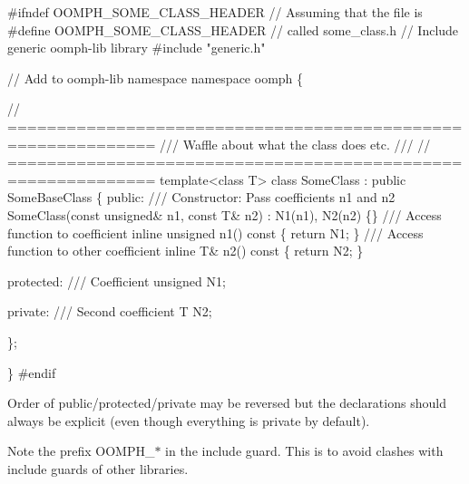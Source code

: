 \begin{DoxyCode}
\textcolor{preprocessor}{#ifndef OOMPH\_SOME\_CLASS\_HEADER     // Assuming that the file is }
\textcolor{preprocessor}{}\textcolor{preprocessor}{#define OOMPH\_SOME\_CLASS\_HEADER     // called some\_class.h}
\textcolor{preprocessor}{}
\textcolor{comment}{// Include generic oomph-lib library}
\textcolor{preprocessor}{#include "generic.h"}

\textcolor{comment}{// Add to oomph-lib namespace}
\textcolor{keyword}{namespace }oomph
\{

\textcolor{comment}{// =============================================================}\textcolor{comment}{}
\textcolor{comment}{/// Waffle about what the class does etc.}
\textcolor{comment}{/// }
\textcolor{comment}{}\textcolor{comment}{// =============================================================}
\textcolor{keyword}{template}<\textcolor{keyword}{class} T>
\textcolor{keyword}{class }SomeClass : \textcolor{keyword}{public} SomeBaseClass
 \{
   \textcolor{keyword}{public}: 
\textcolor{comment}{}
\textcolor{comment}{    /// Constructor: Pass coefficients n1 and n2}
\textcolor{comment}{}    SomeClass(\textcolor{keyword}{const} \textcolor{keywordtype}{unsigned}& n1, \textcolor{keyword}{const} T& n2) : N1(n1), N2(n2)
     \{\}
\textcolor{comment}{}
\textcolor{comment}{    /// Access function to coefficient }
\textcolor{comment}{}    \textcolor{keyword}{inline} \textcolor{keywordtype}{unsigned} n1()\textcolor{keyword}{ const}
\textcolor{keyword}{     }\{
      \textcolor{keywordflow}{return} N1;
     \}
\textcolor{comment}{}
\textcolor{comment}{    /// Access function to other coefficient}
\textcolor{comment}{}    \textcolor{keyword}{inline} T& n2()\textcolor{keyword}{ const}
\textcolor{keyword}{     }\{
      \textcolor{keywordflow}{return} N2;
     \}
   

   \textcolor{keyword}{protected}:
\textcolor{comment}{}
\textcolor{comment}{      /// Coefficient }
\textcolor{comment}{}      \textcolor{keywordtype}{unsigned} N1;

   \textcolor{keyword}{private}:
\textcolor{comment}{}
\textcolor{comment}{      /// Second coefficient}
\textcolor{comment}{}      T  N2;

  \};

 \} 
\textcolor{preprocessor}{ #endif}
\end{DoxyCode}



\begin{DoxyItemize}
\item Order of public/protected/private may be reversed but the declarations should always be explicit (even though everything is private by default).
\item Note the prefix {\ttfamily  O\-O\-M\-P\-H\-\_\-$\ast$} in the include guard. This is to avoid clashes with include guards of other libraries.
\end{DoxyItemize}




